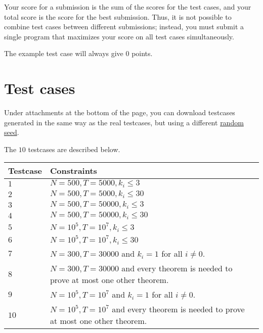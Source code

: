Your score for a submission is the sum of the scores for the test cases, and your total score is the score for the best submission.
Thus, it is not possible to combine test cases between different submissions; instead, you must submit a single program that
maximizes your score on all test cases simultaneously.

The example test case will always give $0$ points.

\section*{Test cases}
Under attachments at the bottom of the page, you can download testcases generated in the same way as the real
testcases, but using a different \href{https://en.wikipedia.org/wiki/Random_seed}{random seed}.

The $10$ testcases are described below.

\noindent
\begin{tabular}{| l | l | l |}
\hline
\textbf{Testcase} & \textbf{Constraints}  \\ \hline
$1$       & $N=500,T=5000,k_i \le 3$  \\ \hline
$2$       & $N=500,T=5000,k_i \le 30$  \\ \hline
$3$       & $N=500,T=50000,k_i \le 3$  \\ \hline
$4$       & $N=500,T=50000,k_i \le 30$  \\ \hline
$5$       & $N=10^5,T=10^7,k_i \le 3$  \\ \hline
$6$       & $N=10^5,T=10^7,k_i \le 30$  \\ \hline
$7$       & $N=300,T=30000$ and $k_i=1$ for all $i \neq 0$. \\ \hline
$8$       & $N=300,T=30000$ and every theorem is needed to prove at most one other theorem. \\ \hline
$9$       & $N=10^5,T=10^7$ and $k_i=1$ for all $i \neq 0$. \\ \hline
$10$      & $N=10^5,T=10^7$ and every theorem is needed to prove at most one other theorem.  \\ \hline
\end{tabular}
